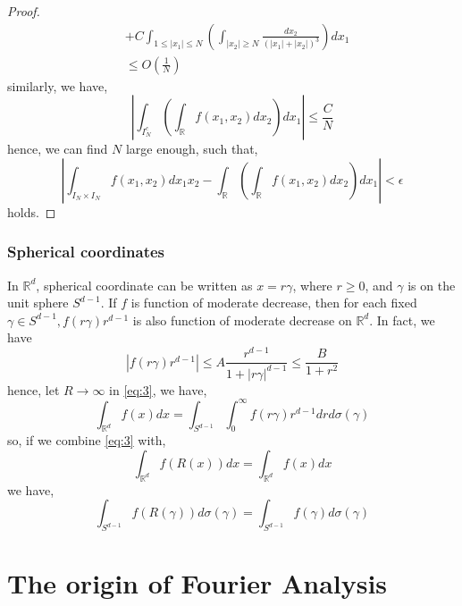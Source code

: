 \documentclass[a4paper]{article}
\numberwithin{equation}{subsection}
\begin{document}
\begin{proof}
\begin{equation}
\begin{split}
            &+ C\int_{1\leq |x_1|\leq N} (\int_{|x_2|\geq N} \frac{dx_2}{(|x_1|+|x_2|)^3}) dx_1 \\
            &\leq O(\frac{1}{N})
        \end{split}
    \end{equation}
    similarly, we have,
    \begin{equation}
        |\int_{I_N^c} (\int_{\mathbb{R}} f(x_1, x_2) dx_2) dx_1| \leq \frac{C}{N}
    \end{equation}
    hence, we can find $N$ large enough, such that,
    \begin{equation}
        |\int_{I_N\times I_N} f(x_1, x_2) dx_1 x_2 - \int_{\mathbb{R}} (\int_{\mathbb{R}} f(x_1, x_2) dx_2) dx_1| < \epsilon
    \end{equation}
    holds.
\end{proof}

\subsubsection{Spherical coordinates}
\par In $\mathbb{R}^d$, spherical coordinate can be written as $x = r \gamma$, where $r\geq 0$, and $\gamma$ is on the unit sphere $S^{d-1}$. If $f$ is function of moderate decrease, then for each fixed $\gamma \in S^{d-1}, f(r\gamma)r^{d-1}$ is also function of moderate decrease on $\mathbb{R}^d$.
In fact, we have
\begin{equation}
    |f(r\gamma)r^{d-1}| \leq A\frac{r^{d-1}}{1+|r\gamma|^{d-1}} \leq \frac{B}{1+r^2}
\end{equation}
hence, let $R \to \infty$ in \cref{eq:3}, we have,
\begin{equation}
    \int_{\mathbb{R}^d}f(x)dx = \int_{S^{d-1}} \int_{0}^{\infty} f(r\gamma)r^{d-1} drd\sigma(\gamma)
\end{equation}
so, if we combine \cref{eq:3} with,
\begin{equation}
    \int_{\mathbb{R}^d}f(R(x))dx = \int_{\mathbb{R}^d} f(x)dx
\end{equation}
we have,
\begin{equation}
    \int_{S^{d-1}} f(R(\gamma)) d\sigma(\gamma) = \int_{S^{d-1}} f(\gamma)d\sigma(\gamma)
\end{equation}

\section{The origin of Fourier Analysis}
\end{document}
